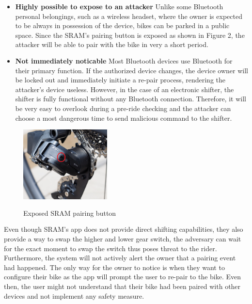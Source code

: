 \documentclass[letterpaper,twocolumn,10pt]{article}
\begin{document}
\begin{itemize}
  \item \textbf{Highly possible to expose to an attacker} Unlike some Bluetooth personal belongings, such as a wireless headset, where the owner is expected to be always in possession of the device, bikes can be parked in a public space. Since the SRAM's pairing button is exposed as shown in Figure 2, the attacker will be able to pair with the bike in very a short period.
  \item \textbf{Not immediately noticable} Most Bluetooth devices use Bluetooth for their primary function. If the authorized device changes, the device owner will be locked out and immediately initiate a re-pair process, rendering the attacker’s device useless. However, in the case of an electronic shifter, the shifter is fully functional without any Bluetooth connection. Therefore, it will be very easy to overlook during a pre-ride checking and the attacker can choose a most dangerous time to send malicious command to the shifter.
\end{itemize}

\begin{figure}[ht]
  \begin{center}
    \centering
    \includegraphics[width=130pt]{images/SRAMbtn.png}
    \label{fig:srambtn}
  \end{center}
  \caption{Exposed SRAM pairing button \cite{james_sram_2021}}
\end{figure}

Even though SRAM's app does not provide direct shifting capabilities, they also provide a way to swap the higher and lower gear switch, the adversary can wait for the exact moment to swap the switch thus poses threat to the rider. Furthermore, the system will not actively alert the owner that a pairing event had happened. The only way for the owner to notice is when they want to configure their bike as the app will prompt the user to re-pair to the bike. Even then, the user might not understand that their bike had been paired with other devices and not implement any safety measure.
\end{document}
